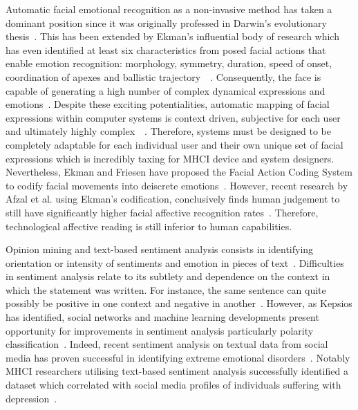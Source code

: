 \documentclass{sigchi}
\begin{document}
Automatic facial emotional recognition as a non-invasive method has taken a dominant position since it was originally professed in Darwin’s evolutionary thesis~\cite{hess2009darwin}. This has been extended by Ekman’s influential body of research which has even identified at least six characteristics from posed facial actions that enable emotion recognition: morphology, symmetry, duration, speed of onset, coordination of apexes and ballistic trajectory~\cite{ekman1992facial}~\cite{keltner2003facial}. Consequently, the face is capable of generating a high number of complex dynamical expressions and emotions~\cite{donato1999classifying}. Despite these exciting potentialities, automatic mapping of facial expressions within computer systems is context driven, subjective for each user and ultimately highly complex~\cite{bartlett1999measuring}~\cite{tian2005facial}. Therefore, systems must be designed to be completely adaptable for each individual user and their own unique set of facial expressions which is incredibly taxing for MHCI device and system designers. Nevertheless, Ekman and Friesen have proposed the Facial Action Coding System to codify facial movements into deiscrete emotions~\cite{cohn2007observer}. However, recent research by Afzal et al. using Ekman’s codification, conclusively finds human judgement to still have significantly higher facial affective recognition rates~\cite{afzal2009perception}. Therefore, technological affective reading is still inferior to human capabilities.  

Opinion mining and text-based sentiment analysis consists in identifying orientation or intensity of sentiments and emotion in pieces of text~\cite{nicolaou2012output}. Difficulties in sentiment analysis relate to its subtlety and dependence on the context in which the statement was written. For instance, the same sentence can quite possibly be positive in one context and negative in another~\cite{marechal2019survey}. However, as Kepsios has identified, social networks and machine learning developments present opportunity for improvements in sentiment analysis particularly polarity classification~\cite{trigeorgis2016adieu}. Indeed, recent sentiment analysis on textual data from social media has proven successful in identifying extreme emotional disorders~\cite{sharma2019automated}. Notably MHCI researchers utilising text-based sentiment analysis successfully identified a dataset which correlated with social media profiles of individuals suffering with depression~\cite{de2013predicting}.
\end{document}
